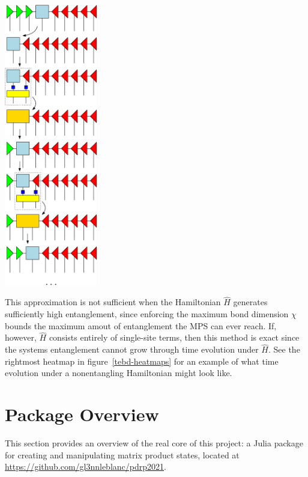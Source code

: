 \documentclass[12pt]{article}
\newenvironment{Figure}
  {\par\medskip\noindent\minipage{\linewidth}}
  {\endminipage\par\medskip}
\begin{document}
\begin{multicols}{2}
	\begin{Figure}
		\center\includegraphics[height=350pt]{./Figures/tebd.eps}
		\label{TEBD}
	\end{Figure}

	This approximation is not sufficient when the Hamiltonian $\hat{H}$
	generates sufficiently high entanglement, since enforcing the
	maximum bond dimension $\chi$ bounds the maximum amout of
	entanglement the MPS can ever reach. If, however, $\hat{H}$ consists
	entirely of single-site terms, then this method is exact since the
	systems entanglement cannot grow through time evolution under
	$\hat{H}$. See the rightmost heatmap in figure~\ref{tebd-heatmaps}
	for an example of what time evolution under a nonentangling
	Hamiltonian might look like.


\section{Package Overview}
	This section provides an overview of the real core of this project: a
	Julia package for creating and manipulating matrix
	product states, located at~\\
	\url{https://github.com/gl3nnleblanc/pdrp2021}.

\end{multicols}
\end{document}
